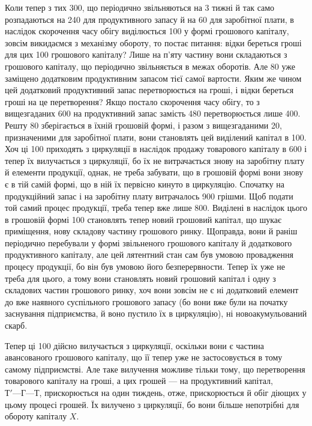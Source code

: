 Коли тепер з тих 300, що періодично звільняються на 3
тижні й так само розпадаються на 240 для продуктивного запасу
й на 60 для заробітної плати, в наслідок скорочення часу
обігу виділюється 100 у формі грошового капіталу, зовсім викидаємся
з механізму обороту, то постає питання: відки береться гроші
для цих 100 грошового капіталу? Лише на п’яту частину вони
складаються з грошового капіталу, що періодично звільняється в межах
оборотів. Але  \deq{} 80 уже заміщено додатковим продуктивним
запасом тієї самої вартости. Яким же чином цей додатковий продуктивний
запас перетворюється на гроші, і відки береться гроші на це перетворення?
Якщо постало скорочення часу обігу, то з вищезгаданих 600
на продуктивний запас замість 480 перетворюється лише 400. Решту 80 зберігається в їхній грошовій формі, і
разом з вищезгаданими 20, призначеними для заробітної плати,
вони становлять цей виділений капітал в 100. Хоч ці 100 приходять з циркуляції в наслідок продажу товарового капіталу в
600 і тепер їх вилучається з циркуляції, бо їх не витрачається
знову на заробітну плату й елементи продукції, однак, не треба забувати,
що в грошовій формі вони знову є в тій самій формі, що в ній їх
первісно кинуто в циркуляцію. Спочатку на продукційний запас і на заробітну
плату витрачалось 900 грішми. Щоб подати той
самий процес продукції, треба тепер вже лише 800. Виділені в
наслідок цього в грошовій формі 100 становлять тепер новий
грошовий капітал, що шукає приміщення, нову складову частину грошового
ринку. Щоправда, вони й раніш періодично перебували у формі
звільненого грошового капіталу й додаткового продуктивного капіталу,
але цей лятентний стан сам був умовою провадження процесу продукції,
бо він був умовою його безперервности. Тепер їх уже не треба для
цього, а тому вони становлять новий грошовий капітал і одну з складових
частин грошового ринку, хоч вони зовсім не є ні додатковий елемент
до вже наявного суспільного грошового запасу (бо вони вже були
на початку заснування підприємства, й воно пустило їх в циркуляцію),
ні новоакумульований скарб.

Тепер ці 100 дійсно вилучається з циркуляції, оскільки вони
є частина авансованого грошового капіталу, що її тепер уже не застосовується
в тому самому підприємстві. Але таке вилучення можливе
тільки тому, що перетворення товарового капіталу на гроші, а цих грошей
— на продуктивний капітал, $Т' — Г — Т$, прискорюється на один тиждень,
отже, прискорюється й обіг діющих у цьому процесі грошей. Їх вилучено
з циркуляції, бо вони більше непотрібні для обороту капіталу $X$.

